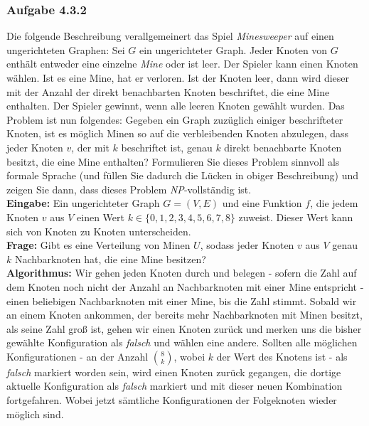 \documentclass{article}
\begin{document}
\subsubsection{Aufgabe 4.3.2}
Die folgende Beschreibung verallgemeinert das Spiel \textit{Minesweeper} auf einen ungerichteten Graphen:
Sei $G$ ein ungerichteter Graph.
Jeder Knoten von $G$ enthält entweder eine einzelne \textit{Mine} oder ist leer.
Der Spieler kann einen Knoten wählen.
Ist es eine Mine, hat er verloren.
Ist der Knoten leer, dann wird dieser mit der Anzahl der direkt benachbarten Knoten beschriftet, die eine Mine enthalten.
Der Spieler gewinnt, wenn alle leeren Knoten gewählt wurden.
Das Problem ist nun folgendes: Gegeben ein Graph zuzüglich einiger beschrifteter Knoten, ist es möglich Minen so auf die verbleibenden Knoten abzulegen, dass jeder Knoten $v$, der mit $k$ beschriftet ist, genau $k$ direkt benachbarte Knoten besitzt, die eine Mine enthalten?
Formulieren Sie dieses Problem sinnvoll als formale Sprache (und füllen Sie dadurch die Lücken in obiger Beschreibung) und zeigen Sie dann, dass dieses Problem \textit{NP}-vollständig ist.
\vspace{1cm}\-\\
\textbf{Eingabe:}
Ein ungerichteter Graph $G = (V, E)$ und eine Funktion $f$, die jedem Knoten $v$ aus $V$ einen Wert $k \in \{0,1,2,3,4,5,6,7,8\}$ zuweist.
Dieser Wert kann sich von Knoten zu Knoten unterscheiden.\\
\textbf{Frage:}
Gibt es eine Verteilung von Minen $U$, sodass jeder Knoten $v$ aus $V$ genau $k$ Nachbarknoten hat, die eine Mine besitzen?
\vspace{1cm}\-\\
\textbf{Algorithmus:}
Wir gehen jeden Knoten durch und belegen - sofern die Zahl auf dem Knoten noch nicht der Anzahl an Nachbarknoten mit einer Mine entspricht - einen beliebigen Nachbarknoten mit einer Mine, bis die Zahl stimmt.
Sobald wir an einem Knoten ankommen, der bereits mehr Nachbarknoten mit Minen besitzt, als seine Zahl groß ist, %
gehen wir einen Knoten zurück und merken uns die bisher gewählte Konfiguration als \textit{falsch} und wählen eine andere.
Sollten alle möglichen Konfigurationen - an der Anzahl $\binom{8}{k}$, wobei $k$ der Wert des Knotens ist - als \textit{falsch} markiert worden sein, wird einen Knoten zurück gegangen, die dortige aktuelle Konfiguration als \textit{falsch} markiert und mit dieser neuen Kombination fortgefahren. Wobei jetzt sämtliche Konfigurationen der Folgeknoten wieder möglich sind.\\
\end{document}
